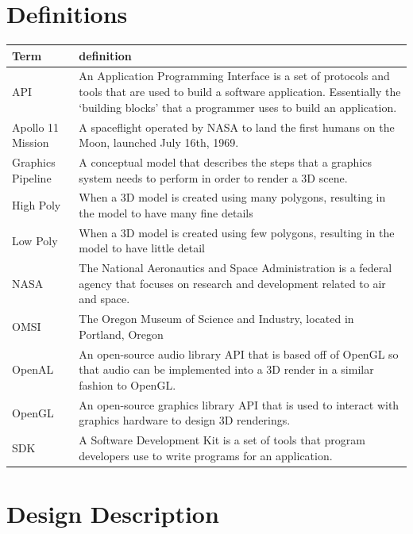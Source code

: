 \documentclass[onecolumn, draftclsnofoot,10pt, compsoc]{IEEEtran}
\begin{document}
\section{Definitions}
\begin{tabular} {|l|p{13.5cm}|}
\hline
Term & definition \\ \hline
API & An Application Programming Interface is a set of protocols and tools that are used to build a software application. Essentially the `building blocks' that a programmer uses to build an application.  \\ \hline
Apollo 11 Mission & A spaceflight operated by NASA to land the first humans on the Moon, launched July 16th, 1969.  \\ \hline
Graphics Pipeline & A conceptual model that describes the steps that a graphics system needs to perform in order to render a 3D scene. \\ \hline
High Poly & When a 3D model is created using many polygons, resulting in the model to have many fine details \\ \hline
Low Poly & When a 3D model is created using few polygons, resulting in the model to have little detail \\ \hline
NASA & The National Aeronautics and Space Administration is a federal agency that focuses on research and development related to air and space.	\\ \hline
OMSI & The Oregon Museum of Science and Industry, located in Portland, Oregon	\\ \hline
OpenAL & An open-source audio library API that is based off of OpenGL so that audio can be implemented into a 3D render in a similar fashion to OpenGL. \\ \hline
OpenGL & An open-source graphics library API that is used to interact with graphics hardware to design 3D renderings.	\\ \hline
SDK & A Software Development Kit is a set of tools that program developers use to write programs for an application. \\ \hline

\end{tabular}

\section{Design Description}
\end{document}
